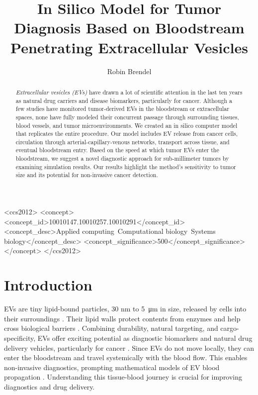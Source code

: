 \documentclass[sigconf]{acmart}
\begin{document}
\title{In Silico Model for Tumor Diagnosis Based on Bloodstream Penetrating Extracellular Vesicles}
\author{Robin Brendel}

\begin{abstract}
\textit{Extracellular vesicles (EVs)} have drawn a lot of scientific attention in the last ten years as natural drug carriers and disease biomarkers, particularly for cancer. Although a few studies have monitored tumor-derived EVs in the bloodstream or extracellular spaces, none have fully modeled their concurrent passage through surrounding tissues, blood vessels, and tumor microenvironments. We created an in silico computer model that replicates the entire procedure. Our model includes EV release from cancer cells, circulation through arterial-capillary-venous networks, transport across tissue, and eventual bloodstream entry. Based on the speed at which tumor EVs enter the bloodstream, we suggest a novel diagnostic approach for sub-millimeter tumors by examining simulation results. Our results highlight the method's sensitivity to tumor size and its potential for non-invasive cancer detection. 
\end{abstract}

\begin{CCSXML}
<ccs2012>
 <concept>
  <concept_id>10010147.10010257.10010291</concept_id>
  <concept_desc>Applied computing~Computational biology~Systems biology</concept_desc>
  <concept_significance>500</concept_significance>
 </concept>
</ccs2012>
\end{CCSXML}



\maketitle

\section{Introduction}
\label{sec: introduction}
EVs are tiny lipid-bound particles, 30 nm to \SI{5}{\micro\meter} in size, released by cells into their surroundings \cite{Doyle_2019}. Their lipid walls protect contents from enzymes and help cross biological barriers \cite{Arjmandi_2021}. Combining durability, natural targeting, and cargo-specificity\cite{Piffoux_2018}, EVs offer exciting potential as diagnostic biomarkers and natural drug delivery vehicles, particularly for cancer \cite{Doyle_2019}. Since EVs do not move locally, they can enter the bloodstream and travel systemically with the blood flow. This enables non-invasive diagnostics, prompting mathematical models of EV blood propagation \cite{Ferguson_2020}. Understanding this tissue-blood journey is crucial for improving diagnostics and drug delivery. 
\end{document}
